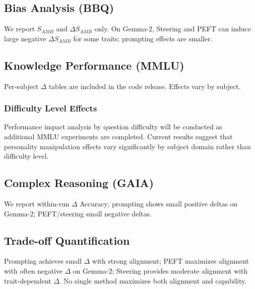 \subsection{Bias Analysis (BBQ)}

We report \(S_{AMB}\) and \(\Delta S_{AMB}\) only. On Gemma-2, Steering and PEFT can induce large negative \(\Delta S_{AMB}\) for some traits; prompting effects are smaller.

\subsection{Knowledge Performance (MMLU)}

Per-subject \(\Delta\) tables are included in the code release. Effects vary by subject.

\subsubsection{Difficulty Level Effects}

Performance impact analysis by question difficulty will be conducted as additional MMLU experiments are completed. Current results suggest that personality manipulation effects vary significantly by subject domain rather than difficulty level.

\subsection{Complex Reasoning (GAIA)}

We report within-run \(\Delta\) Accuracy; prompting shows small positive deltas on Gemma-2; PEFT/steering small negative deltas.

\subsection{Trade-off Quantification}

Prompting achieves small \(\Delta\) with strong alignment; PEFT maximizes alignment with often negative \(\Delta\) on Gemma-2; Steering provides moderate alignment with trait-dependent \(\Delta\). No single method maximizes both alignment and capability.
